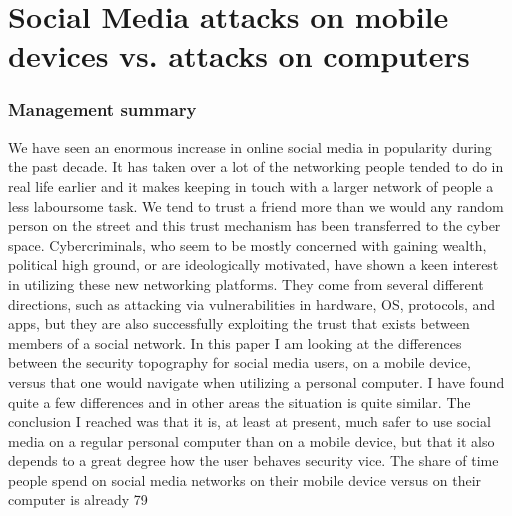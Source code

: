 \chapter[Social Media Attacks]{Social Media attacks on mobile devices vs. attacks on computers}
\subsection*{Management summary}
We have seen an enormous increase in online social media in popularity during the past decade. It has taken over a lot of the networking people tended to do in real life earlier and it makes keeping in touch with a larger network of people a less laboursome task. We tend to trust a friend more than we would any random person on the street and this trust mechanism has been transferred to the cyber space. Cybercriminals, who seem to be mostly concerned with gaining wealth, political high ground, or are ideologically motivated, have shown a keen interest in utilizing these new networking platforms. They come from several different directions, such as attacking via vulnerabilities in hardware, OS, protocols, and apps, but they are also successfully exploiting the trust that exists between members of a social network.
In this paper I am looking at the differences between the security topography for social media users, on a mobile device, versus that one would navigate when utilizing a personal computer. I have found quite a few differences and in other areas the situation is quite similar. The conclusion I reached was that it is, at least at present, much safer to use social media on a regular personal computer than on a mobile device, but that it also depends to a great degree how the user behaves security vice. The share of time people spend on social media networks on their mobile device versus on their computer is already 79%
